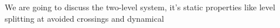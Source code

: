 We are going to discuss the two-level system, it's static properties like level splitting at avoided crossings and dynamical 